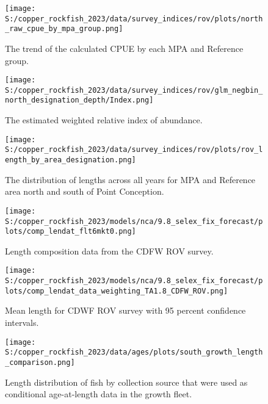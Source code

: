 \documentclass[11pt,
  english,
  letterpaper,
]{article}
\begin{document}
\pagebreak

\begin{figure}
\centering
\texttt{[image: S:/copper\_rockfish\_2023/data/survey\_indices/rov/plots/north\_raw\_cpue\_by\_mpa\_group.png]}
\caption{The trend of the calculated CPUE by each MPA and Reference group.\label{fig:rov-raw-cpue}}
\end{figure}

\pagebreak

\begin{figure}
\centering
\texttt{[image: S:/copper\_rockfish\_2023/data/survey\_indices/rov/glm\_negbin\_north\_designation\_depth/Index.png]}
\caption{The estimated weighted relative index of abundance.\label{fig:rov-index-main}}
\end{figure}

\pagebreak

\begin{figure}
\centering
\texttt{[image: S:/copper\_rockfish\_2023/data/survey\_indices/rov/plots/rov\_length\_by\_area\_designation.png]}
\caption{The distribution of lengths across all years for MPA and Reference area north and south of Point Conception.\label{fig:rov-len}}
\end{figure}

\pagebreak

\begin{figure}
\centering
\texttt{[image: S:/copper\_rockfish\_2023/models/nca/9.8\_selex\_fix\_forecast/plots/comp\_lendat\_flt6mkt0.png]}
\caption{Length composition data from the CDFW ROV survey.\label{fig:rov-len-data}}
\end{figure}

\pagebreak

\begin{figure}
\centering
\texttt{[image: S:/copper\_rockfish\_2023/models/nca/9.8\_selex\_fix\_forecast/plots/comp\_lendat\_data\_weighting\_TA1.8\_CDFW\_ROV.png]}
\caption{Mean length for CDWF ROV survey with 95 percent confidence intervals.\label{fig:mean-rov-len-data}}
\end{figure}

\pagebreak

\begin{figure}
\centering
\texttt{[image: S:/copper\_rockfish\_2023/data/ages/plots/south\_growth\_length\_comparison.png]}
\caption{Length distribution of fish by collection source that were used as conditional age-at-length data in the growth fleet.\label{fig:growth-len-dist}}
\end{figure}
\end{document}
